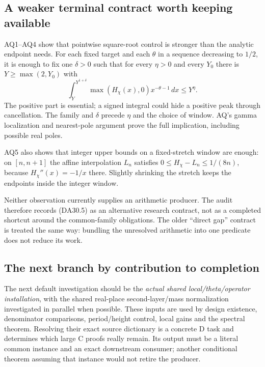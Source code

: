 \subsection{A weaker terminal contract worth keeping available}

AQ1--AQ4 show that pointwise square-root control is stronger than the
analytic endpoint needs.  For each fixed target and each $\theta$ in
a sequence decreasing to $1/2$, it is enough to fix one $\delta>0$
such that for every $\eta>0$ and every $Y_0$ there is
$Y\ge\max(2,Y_0)$ with
\[
 \int_Y^{Y^{1+\delta}}\max(H_\chi(x),0)x^{-\theta-1}\,dx
                        \le Y^\eta.                              \tag{DA30.5}
\]
The positive part is essential; a signed integral could hide a positive
peak through cancellation.  The family and $\delta$ precede $\eta$
and the choice of window.  AQ's gamma localization and nearest-pole
argument prove the full implication, including possible real poles.

AQ5 also shows that integer upper bounds on a fixed-stretch window
are enough: on $[n,n+1]$ the affine interpolation $L_n$ satisfies
$0\le H_\chi-L_n\le1/(8n)$, because
$H_\chi''(x)=-1/x$ there.  Slightly shrinking the stretch keeps the
endpoints inside the integer window.

Neither observation currently supplies an arithmetic producer.  The
audit therefore records (DA30.5) as an alternative research contract,
not as a completed shortcut around the common-family obligations.
The older ``direct gap'' contract is treated the same way: bundling
the unresolved arithmetic into one predicate does not reduce its work.

\subsection{The next branch by contribution to completion}

The next default investigation should be the \emph{actual shared
local/theta/operator installation}, with the shared real-place
second-layer/mass normalization investigated in parallel when possible.
These inputs are used by design existence, denominator comparisons,
period/height control, local gains and the spectral theorem.  Resolving
their exact source dictionary is a concrete D task and determines which
large C proofs really remain.  Its output must be a literal common
instance and an exact downstream consumer; another conditional theorem
assuming that instance would not retire the producer.

